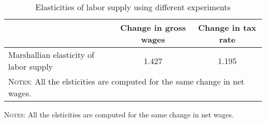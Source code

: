 \begin{table}[htbp]\caption{Elasticities of labor supply using different experiments}\label{table:elasticities}\centering\footnotesize\begin{tabular}{lcc} \toprule & Change in gross wages & Change in tax rate   \\\midrule    Marshallian elasticity of labor supply &1.427&1.195\\  \bottomrule\multicolumn{3}{l}{\textsc{Notes:} All the elsticities are computed for the same change in net wages.}\end{tabular}
      {\raggedright\footnotesize \textsc{Notes:} All the elsticities are computed for the same change in net wages.\par}\end{table}